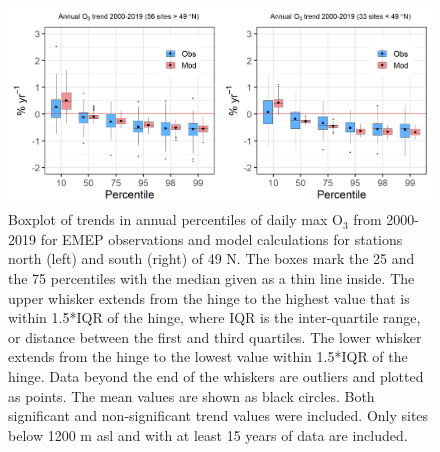 \begin{figure}[h]
	\centering
	\includegraphics[width=0.74\paperwidth]{FIGS_TRENDS/O3_boxpl.png}
	\caption{\label{fig:O3_boxplot}Boxplot of trends in annual percentiles of daily max O$_3$ from 2000-2019 for EMEP observations and model calculations for stations north (left) and south (right) of 49 \degrees N. The boxes mark the 25 and the 75 percentiles with the median given as a thin line inside. The upper whisker extends from the hinge to the highest value that is within 1.5*IQR of the hinge, where IQR is the inter-quartile range, or distance between the first and third quartiles. The lower whisker extends from the hinge to the lowest value within 1.5*IQR of the hinge. Data beyond the end of the whiskers are outliers and plotted as points. The mean values are shown as black circles. Both significant and non-significant trend values were included. Only sites below 1200 m asl and with at least 15 years of data are included.}
\end{figure}

